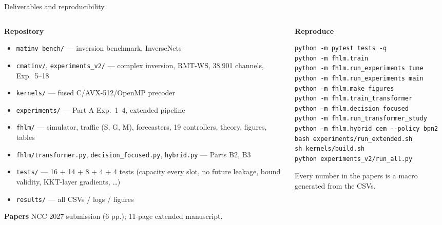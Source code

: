 \documentclass[aspectratio=169,11pt,xcolor=table]{beamer}
\begin{document}
\begin{frame}[fragile]{Deliverables and reproducibility}
  \footnotesize
  \begin{columns}[T]
    \begin{column}{0.5\textwidth}
      \textbf{Repository}
      \scriptsize
      \begin{itemize}
        \item \texttt{matinv\_bench/} --- inversion benchmark, InverseNets
        \item \texttt{cmatinv/}, \texttt{experiments\_v2/} --- complex inversion, RMT-WS, 38.901 channels, Exp.\ 5--18
        \item \texttt{kernels/} --- fused C/AVX-512/OpenMP precoder
        \item \texttt{experiments/} --- Part A Exp.\ 1--4, extended pipeline
        \item \texttt{fhlm/} --- simulator, traffic (S, G, M), forecasters, 19 controllers, theory, figures, tables
        \item \texttt{fhlm/transformer.py}, \texttt{decision\_focused.py}, \texttt{hybrid.py} --- Parts B2, B3
        \item \texttt{tests/} --- 16 + 14 + 8 + 4 + 4 tests (capacity every slot, no future leakage, bound validity, KKT-layer gradients, \dots)
        \item \texttt{results/} --- all CSVs / logs / figures
      \end{itemize}
      \textbf{Papers}
      NCC 2027 submission (6 pp.); 11-page extended manuscript.
    \end{column}
    \begin{column}{0.5\textwidth}
      \textbf{Reproduce}
      \scriptsize
\begin{verbatim}
python -m pytest tests -q
python -m fhlm.train
python -m fhlm.run_experiments tune
python -m fhlm.run_experiments main
python -m fhlm.make_figures
python -m fhlm.train_transformer
python -m fhlm.decision_focused
python -m fhlm.run_transformer_study
python -m fhlm.hybrid cem --policy bpn2
bash experiments/run_extended.sh
sh kernels/build.sh
python experiments_v2/run_all.py
\end{verbatim}
      \normalsize
      \small Every number in the papers is a macro generated from the CSVs.
    \end{column}
  \end{columns}
\end{frame}
\end{document}
